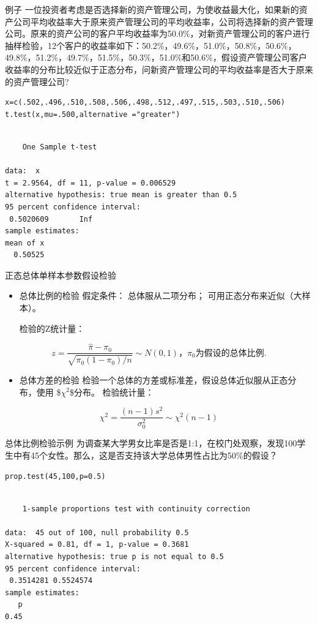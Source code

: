 \documentclass[presentation]{beamer}
\begin{document}
\begin{frame}[fragile,label={sec:orge67d7f1}]{例子}
 一位投资者考虑是否选择新的资产管理公司，为使收益最大化，如果新的资产公司平均收益率大于原来资产管理公司的平均收益率，公司将选择新的资产管理公司。原来的资产公司的客户平均收益率为50.0\%，对新资产管理公司的客户进行抽样检验，12个客户的收益率如下：50.2\%，49.6\%，51.0\%，50.8\%，50.6\%，49.8\%，51.2\%，49.7\%，51.5\%，50.3\%，51.0\%和50.6\%，假设资产管理公司客户收益率的分布比较近似于正态分布，问新资产管理公司的平均收益率是否大于原来的资产管理公司? 
\begin{verbatim}
x=c(.502,.496,.510,.508,.506,.498,.512,.497,.515,.503,.510,.506)
t.test(x,mu=.500,alternative ="greater") 
\end{verbatim}

\begin{verbatim}

	One Sample t-test

data:  x
t = 2.9564, df = 11, p-value = 0.006529
alternative hypothesis: true mean is greater than 0.5
95 percent confidence interval:
 0.5020609       Inf
sample estimates:
mean of x 
  0.50525 

\end{verbatim}
\end{frame}

\begin{frame}[label={sec:orga529568}]{正态总体单样本参数假设检验}
\begin{itemize}
\item 总体比例的检验  
假定条件：
 总体服从二项分布；
 可用正态分布来近似（大样本）。  

检验的Z统计量：
\end{itemize}
$$ z=\frac{\hat \pi-\pi_0}{\sqrt{\pi_0(1-\pi_0)/n}}\sim N(0,1)，\pi_0为假设的总体比例. $$

\begin{itemize}
\item 总体方差的检验  
检验一个总体的方差或标准差，假设总体近似服从正态分布，使用 \$\(\chi^{\text{2}}\)\$分布。  
检验统计量：
\end{itemize}
$$ \chi^2=\frac{(n-1)s^2}{\sigma_0^2}\sim \chi^2(n-1)$$
\end{frame}

\begin{frame}[fragile,label={sec:org945de88}]{总体比例检验示例}
 为调查某大学男女比率是否是1:1，在校门处观察，发现100学生中有45个女性。那么，这是否支持该大学总体男性占比为50\%的假设？
\begin{verbatim}
prop.test(45,100,p=0.5)
\end{verbatim}

\begin{verbatim}

	1-sample proportions test with continuity correction

data:  45 out of 100, null probability 0.5
X-squared = 0.81, df = 1, p-value = 0.3681
alternative hypothesis: true p is not equal to 0.5
95 percent confidence interval:
 0.3514281 0.5524574
sample estimates:
   p 
0.45 

\end{verbatim}
\end{frame}
\end{document}
